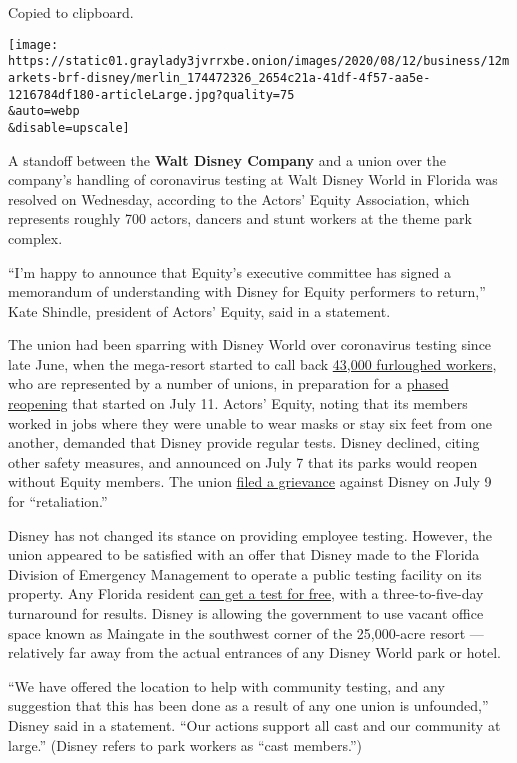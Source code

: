Copied to clipboard.

\texttt{[image: https://static01.graylady3jvrrxbe.onion/images/2020/08/12/business/12markets-brf-disney/merlin\_174472326\_2654c21a-41df-4f57-aa5e-1216784df180-articleLarge.jpg?quality=75\\\&auto=webp\\\&disable=upscale]}

A standoff between the \textbf{Walt Disney Company} and a union over the
company's handling of coronavirus testing at Walt Disney World in
Florida was resolved on Wednesday, according to the Actors' Equity
Association, which represents roughly 700 actors, dancers and stunt
workers at the theme park complex.

``I'm happy to announce that Equity's executive committee has signed a
memorandum of understanding with Disney for Equity performers to
return,'' Kate Shindle, president of Actors' Equity, said in a
statement.

The union had been sparring with Disney World over coronavirus testing
since late June, when the mega-resort started to call back
\href{https://www.nytimes3xbfgragh.onion/2020/04/12/business/disney-furloughs-coronavirus.html}{43,000
furloughed workers}, who are represented by a number of unions, in
preparation for a
\href{https://www.nytimes3xbfgragh.onion/2020/07/08/business/coronavirus-disney-world-reopening.html}{phased
reopening} that started on July 11. Actors' Equity, noting that its
members worked in jobs where they were unable to wear masks or stay six
feet from one another, demanded that Disney provide regular tests.
Disney declined, citing other safety measures, and announced on July 7
that its parks would reopen without Equity members. The union
\href{https://www.actorsequity.org/news/PR/DisneyGrievance/}{filed a
grievance} against Disney on July 9 for ``retaliation.''

Disney has not changed its stance on providing employee testing.
However, the union appeared to be satisfied with an offer that Disney
made to the Florida Division of Emergency Management to operate a public
testing facility on its property. Any Florida resident
\href{https://doineedacovid19test.com/Kissimmee_FL_1147.html}{can get a
test for free}, with a three-to-five-day turnaround for results. Disney
is allowing the government to use vacant office space known as Maingate
in the southwest corner of the 25,000-acre resort --- relatively far
away from the actual entrances of any Disney World park or hotel.

``We have offered the location to help with community testing, and any
suggestion that this has been done as a result of any one union is
unfounded,'' Disney said in a statement. ``Our actions support all cast
and our community at large.'' (Disney refers to park workers as ``cast
members.'')

